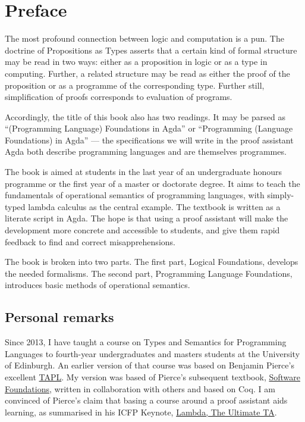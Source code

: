 \hypertarget{Preface}{%
\chapter{Preface}\label{Preface}}

The most profound connection between logic and computation is a pun. The
doctrine of Propositions as Types asserts that a certain kind of formal
structure may be read in two ways: either as a proposition in logic or
as a type in computing. Further, a related structure may be read as
either the proof of the proposition or as a programme of the
corresponding type. Further still, simplification of proofs corresponds
to evaluation of programs.

Accordingly, the title of this book also has two readings. It may be
parsed as ``(Programming Language) Foundations in Agda'' or
``Programming (Language Foundations) in Agda'' --- the specifications we
will write in the proof assistant Agda both describe programming
languages and are themselves programmes.

The book is aimed at students in the last year of an undergraduate
honours programme or the first year of a master or doctorate degree. It
aims to teach the fundamentals of operational semantics of programming
languages, with simply-typed lambda calculus as the central example. The
textbook is written as a literate script in Agda. The hope is that using
a proof assistant will make the development more concrete and accessible
to students, and give them rapid feedback to find and correct
misapprehensions.

The book is broken into two parts. The first part, Logical Foundations,
develops the needed formalisms. The second part, Programming Language
Foundations, introduces basic methods of operational semantics.

\hypertarget{personal-remarks}{%
\section{Personal remarks}\label{personal-remarks}}

Since 2013, I have taught a course on Types and Semantics for
Programming Languages to fourth-year undergraduates and masters students
at the University of Edinburgh. An earlier version of that course was
based on Benjamin Pierce's excellent
\href{https://www.cis.upenn.edu/~bcpierce/tapl/}{TAPL}. My version was
based of Pierce's subsequent textbook,
\href{https://softwarefoundations.cis.upenn.edu/}{Software Foundations},
written in collaboration with others and based on Coq. I am convinced of
Pierce's claim that basing a course around a proof assistant aids
learning, as summarised in his ICFP Keynote,
\href{https://www.cis.upenn.edu/~bcpierce/papers/plcurriculum.pdf}{Lambda,
The Ultimate TA}.

